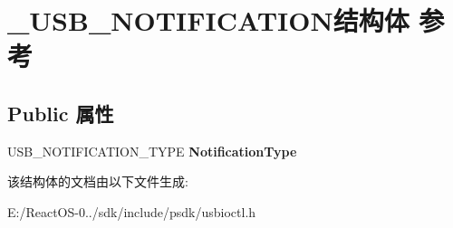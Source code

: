 \hypertarget{struct___u_s_b___n_o_t_i_f_i_c_a_t_i_o_n}{}\section{\+\_\+\+U\+S\+B\+\_\+\+N\+O\+T\+I\+F\+I\+C\+A\+T\+I\+O\+N结构体 参考}
\label{struct___u_s_b___n_o_t_i_f_i_c_a_t_i_o_n}
\subsection*{Public 属性}
\begin{DoxyCompactItemize}
\item 
\mbox{\label{struct___u_s_b___n_o_t_i_f_i_c_a_t_i_o_n_a1412c41003301cbc138c60556eeec5fb}} 
U\+S\+B\+\_\+\+N\+O\+T\+I\+F\+I\+C\+A\+T\+I\+O\+N\+\_\+\+T\+Y\+PE {\bfseries Notification\+Type}
\end{DoxyCompactItemize}


该结构体的文档由以下文件生成\+:\begin{DoxyCompactItemize}
\item 
E\+:/\+React\+O\+S-\/0../sdk/include/psdk/usbioctl.\+h\end{DoxyCompactItemize}
